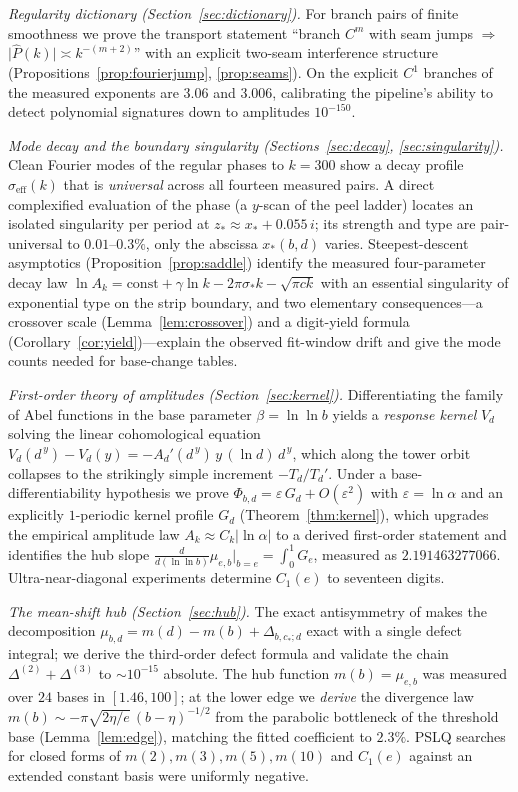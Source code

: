 \documentclass[11pt,a4paper]{article}
\theoremstyle{definition}
\theoremstyle{remark}
\newcommand{\eff}{\mathrm{eff}}
\begin{document}
\emph{Regularity dictionary (Section~\ref{sec:dictionary}).} For branch pairs of finite
smoothness we prove the transport statement ``branch $C^m$ with seam jumps $\Rightarrow$
$\lvert\widehat P(k)\rvert\asymp k^{-(m+2)}$'' with an explicit two-seam interference
structure (Propositions~\ref{prop:fourierjump}, \ref{prop:seams}). On the explicit $C^1$
branches of \cite[Rem.~7.5(ii)]{unified} the measured exponents are $3.06$ and $3.006$,
calibrating the pipeline's ability to detect polynomial signatures down to amplitudes
$10^{-150}$.

\emph{Mode decay and the boundary singularity (Sections~\ref{sec:decay},
\ref{sec:singularity}).} Clean Fourier modes of the regular phases to $k=300$ show a decay
profile $\sigma_\eff(k)$ that is \emph{universal} across all fourteen measured pairs. A direct
complexified evaluation of the phase (a $y$-scan of the peel ladder) locates an isolated
singularity per period at $z_*\approx x_*+0.055\,i$; its strength and type are pair-universal
to $0.01$--$0.3\%$, only the abscissa $x_*(b,d)$ varies. Steepest-descent asymptotics
(Proposition~\ref{prop:saddle}) identify the measured four-parameter decay law
$\ln A_k = \mathrm{const}+\gamma\ln k-2\pi\sigma_* k-\sqrt{\pi c k}$ with an essential
singularity of exponential type on the strip boundary, and two elementary consequences---a
crossover scale (Lemma~\ref{lem:crossover}) and a digit-yield formula
(Corollary~\ref{cor:yield})---explain the observed fit-window drift and give the mode counts
needed for base-change tables.

\emph{First-order theory of amplitudes (Section~\ref{sec:kernel}).} Differentiating the family
of Abel functions in the base parameter $\beta=\ln\ln b$ yields a \emph{response kernel}
$V_d$ solving the linear cohomological equation
$V_d(d^{\,y})-V_d(y)=-A_d'(d^{\,y})\,y\,(\ln d)\,d^{\,y}$, which along the tower orbit
collapses to the strikingly simple increment $-T_d/T_d'$. Under a base-differentiability
hypothesis we prove $\Phi_{b,d}=\varepsilon\,G_d+O(\varepsilon^2)$ with
$\varepsilon=\ln\alpha$ and an explicitly $1$-periodic kernel profile $G_d$
(Theorem~\ref{thm:kernel}), which upgrades the empirical amplitude law
$A_k\approx C_k\lvert\ln\alpha\rvert$ to a derived first-order statement and identifies the
hub slope $\frac{d}{d(\ln\ln b)}\mu_{e,b}\big|_{b=e}=\int_0^1 G_e$, measured as
$2.191463277066$. Ultra-near-diagonal experiments determine $C_1(e)$ to seventeen digits.

\emph{The mean-shift hub (Section~\ref{sec:hub}).} The exact antisymmetry of \cite{unified}
makes the decomposition $\mu_{b,d}=m(d)-m(b)+\Delta_{b,c_*;d}$ exact with a single defect
integral; we derive the third-order defect formula and validate the chain
$\Delta^{(2)}+\Delta^{(3)}$ to $\sim10^{-15}$ absolute. The hub function $m(b)=\mu_{e,b}$ was
measured over $24$ bases in $[1.46,100]$; at the lower edge we \emph{derive} the divergence
law $m(b)\sim-\pi\sqrt{2\eta/e}\,(b-\eta)^{-1/2}$ from the parabolic bottleneck of the
threshold base (Lemma~\ref{lem:edge}), matching the fitted coefficient to $2.3\%$. PSLQ
searches for closed forms of $m(2),m(3),m(5),m(10)$ and $C_1(e)$ against an extended constant
basis were uniformly negative.
\end{document}
